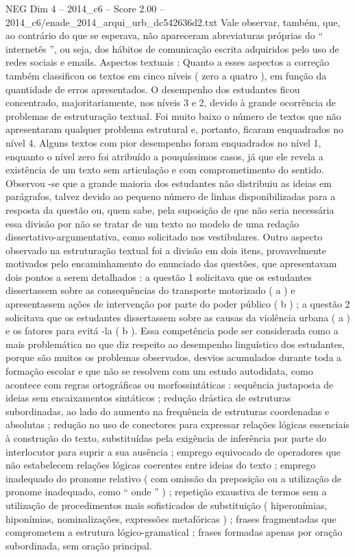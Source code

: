 \begin{textsample}{NEG Dim 4 – 2014\_c6 – Score 2.00 – 2014\_c6/enade\_2014\_arqui\_urb\_dc542636d2.txt}
Vale observar, também, que, ao contrário do que se esperava, não apareceram abreviaturas próprias do “ internetês ”, ou seja, dos hábitos de comunicação escrita adquiridos pelo uso de redes sociais e emails.
Aspectos textuais : Quanto a esses aspectos a correção também classificou os textos em cinco níveis ( zero a quatro ), em função da quantidade de erros apresentados.
O desempenho dos estudantes ficou concentrado, majoritariamente, nos níveis 3 e 2, devido à grande ocorrência de problemas de estruturação textual.
Foi muito baixo o número de textos que não apresentaram qualquer problema estrutural e, portanto, ficaram enquadrados no nível 4.
Alguns textos com pior desempenho foram enquadrados no nível 1, enquanto o nível zero foi atribuído a pouquíssimos casos, já que ele revela a existência de um texto sem articulação e com comprometimento do sentido.
Observou -se que a grande maioria dos estudantes não distribuiu as ideias em parágrafos, talvez devido ao pequeno número de linhas disponibilizadas para a resposta da questão ou, quem sabe, pela suposição de que não seria necessária essa divisão por não se tratar de um texto no modelo de uma redação dissertativo-argumentativa, como solicitado nos vestibulares.
Outro aspecto observado na estruturação textual foi a divisão em dois itens, provavelmente motivados pelo encaminhamento do enunciado das questões, que apresentavam dois pontos a serem detalhados : a questão 1 solicitava que os estudantes dissertassem sobre as consequências do transporte motorizado ( a ) e apresentassem ações de intervenção por parte do poder público ( b ) ; a questão 2 solicitava que os estudantes dissertassem sobre as causas da violência urbana ( a ) e os fatores para evitá -la ( b ).
Essa competência pode ser considerada como a mais problemática no que diz respeito ao desempenho linguístico dos estudantes, porque são muitos os problemas observados, desvios acumulados durante toda a formação escolar e que não se resolvem com um estudo autodidata, como acontece com regras ortográficas ou morfossintáticas : sequência justaposta de ideias sem encaixamentos sintáticos ; redução drástica de estruturas subordinadas, ao lado do aumento na frequência de estruturas coordenadas e absolutas ; redução no uso de conectores para expressar relações lógicas essenciais à construção do texto, substituídas pela exigência de inferência por parte do interlocutor para suprir a sua ausência ; emprego equivocado de operadores que não estabelecem relações lógicas coerentes entre ideias do texto ; emprego inadequado do pronome relativo ( com omissão da preposição ou a utilização de pronome inadequado, como “ onde ” ) ; repetição exaustiva de termos sem a utilização de procedimentos mais sofisticados de substituição ( hiperonímias, hiponímias, nominalizações, expressões metafóricas ) ; frases fragmentadas que comprometem a estrutura lógico-gramatical ; frases formadas apenas por oração subordinada, sem oração principal.

\end{textsample}

